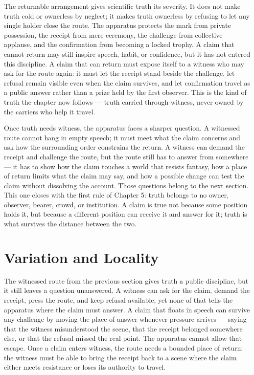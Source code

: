 The returnable arrangement gives scientific truth its severity. It does not make truth cold or ownerless by neglect; it makes truth ownerless by refusing to let any single holder close the route. The apparatus protects the mark from private possession, the receipt from mere ceremony, the challenge from collective applause, and the confirmation from becoming a locked trophy. A claim that cannot return may still inspire speech, habit, or confidence, but it has not entered this discipline. A claim that can return must expose itself to a witness who may ask for the route again: it must let the receipt stand beside the challenge, let refusal remain visible even when the claim survives, and let confirmation travel as a public answer rather than a prize held by the first observer. This is the kind of truth the chapter now follows --- truth carried through witness, never owned by the carriers who help it travel.

Once truth needs witness, the apparatus faces a sharper question. A witnessed route cannot hang in empty speech; it must meet what the claim concerns and ask how the surrounding order constrains the return. A witness can demand the receipt and challenge the route, but the route still has to answer from somewhere --- it has to show how the claim touches a world that resists fantasy, how a place of return limits what the claim may say, and how a possible change can test the claim without dissolving the account. Those questions belong to the next section. This one closes with the first rule of Chapter 5: truth belongs to no owner, observer, bearer, crowd, or institution. A claim is true not because some position holds it, but because a different position can receive it and answer for it; truth is what survives the distance between the two.

\section{Variation and Locality}

The witnessed route from the previous section gives truth a public discipline, but it still leaves a question unanswered. A witness can ask for the claim, demand the receipt, press the route, and keep refusal available, yet none of that tells the apparatus where the claim must answer. A claim that floats in speech can survive any challenge by moving the place of answer whenever pressure arrives --- saying that the witness misunderstood the scene, that the receipt belonged somewhere else, or that the refusal missed the real point. The apparatus cannot allow that escape. Once a claim enters witness, the route needs a bounded place of return: the witness must be able to bring the receipt back to a scene where the claim either meets resistance or loses its authority to travel.

